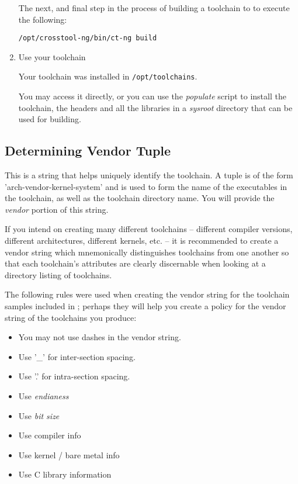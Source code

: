 \begin{enumerate}
    The next, and final step in the process of building a toolchain to
    to execute the following:

\begin{verbatim}
/opt/crosstool-ng/bin/ct-ng build
\end{verbatim}

   \item Use your toolchain

     Your toolchain was installed in \texttt{/opt/toolchains}.

     You may access it directly, or you can use the \emph{populate}
     script to install the toolchain, the headers and all the
     libraries in a \emph{sysroot} directory that can be used for
     building.

\end{enumerate}

\subsection{Determining Vendor Tuple}\label{toolchain-config:vendor-string}

This is a string that helps uniquely identify the toolchain.  A tuple
is of the form 'arch-vendor-kernel-system' and is used to form the
name of the executables in the toolchain, as well as the toolchain
directory name.  You will provide the \emph{vendor} portion of this
string.

If you intend on creating many different toolchains -- different
compiler versions, different architectures, different kernels, etc. --
it is recommended to create a vendor string which mnemonically
distinguishes toolchains from one another so that each toolchain's
attributes are clearly discernable when looking at a directory listing
of toolchains.

The following rules were used when creating the vendor string for the
toolchain samples included in \lmsbw; perhaps they will help you
create a policy for the vendor string of the toolchains you produce:

\begin{itemize}
\item{You may not use dashes in the vendor string.}
\item{Use '\_' for inter-section spacing.}
\item{Use '.' for intra-section spacing.}
\item{Use \emph{endianess}}
\item{Use \emph{bit size}}
\item{Use compiler info}
\item{Use kernel / bare metal info}
\item{Use C library information}
\end{itemize}

